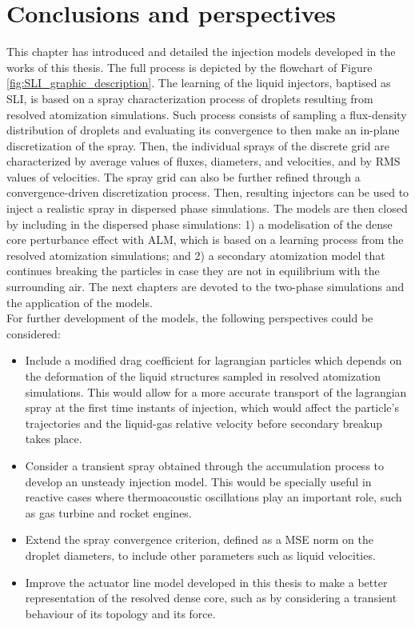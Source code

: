 \section{Conclusions and perspectives}

This chapter has introduced and detailed the injection models developed in the works of this thesis. The full process is depicted by the flowchart of Figure \ref{fig:SLI_graphic_description}. The learning of the liquid injectors, baptised as SLI, is based on a spray characterization process of droplets resulting from resolved atomization simulations. Such process consists of sampling a flux-density distribution of droplets and evaluating its convergence to then make an in-plane discretization of the spray. Then, the individual sprays of the discrete grid are characterized by average values of fluxes, diameters, and velocities, and by RMS values of velocities. The spray grid can also be further refined through a convergence-driven discretization process. Then, resulting injectors can be used to inject a realistic spray in dispersed phase simulations. The models are then closed by including in the dispersed phase simulations: 1) a modelisation of the dense core perturbance effect with ALM, which is based on a learning process from the resolved atomization simulations; and 2) a secondary atomization model that continues breaking the particles in case they are not in equilibrium with the surrounding air. The next chapters are devoted to the two-phase simulations and the application of the models. \\

For further development of the models, the following perspectives could be considered:

\begin{itemize}

	\item Include a modified drag coefficient for lagrangian particles which depends on the deformation of the liquid structures sampled in resolved atomization simulations. This would allow for a more accurate transport of the lagrangian spray at the first time instants of injection, which would affect the particle's trajectories and the liquid-gas relative velocity before secondary breakup takes place. 
	
	\item Consider a transient spray obtained through the accumulation process to develop an unsteady injection model. This would be specially useful in reactive cases where thermoacoustic oscillations play an important role, such as gas turbine and rocket engines. 

	\item Extend the spray convergence criterion, defined as a MSE norm on the droplet diameters, to include other parameters such as liquid velocities.
	
	\item Improve the actuator line model developed in this thesis to make a better representation of the resolved dense core, such as by considering a transient behaviour of its topology and its force.

\end{itemize}